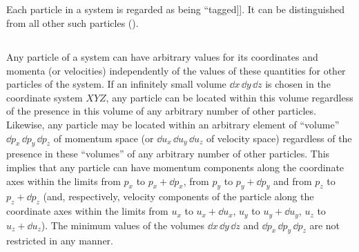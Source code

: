 \subsection{}\label{10.1.4} Each particle in a system is regarded as being ``tagged]]. It can be distinguished from all other such particles (). 

\subsection{}\label{10.1.5} Any particle of a system can have arbitrary values for its coordinates and momenta (or velocities) independently of the values of these quantities for other particles of the system. If an infinitely small volume $\dd x \,\dd y \, \dd z$ is chosen in the coor­dinate system $XYZ$, any particle can be located within this volume regardless of the presence in this volume of any arbi­trary number of other particles. Likewise, any particle may be located within an arbitrary element of ``volume'' $\dd p_{x}\, \dd p_{y}\, \dd p_{z}$ of momentum space (or $\dd u_{x}\, \dd u_{y}\, \dd u_{z}$ of velocity space) regardless of the presence in these ``volumes'' of any arbitrary number of other particles. This implies that any particle can have momen­tum components along the coordinate axes within the limits from $p_{x}$ to $p_{x} + \dd p_{x}$, from $p_{y}$ to $p_{y} + \dd p_{y}$ and from $p_{z}$ to $p_{z} + \dd p_{z}$ (and, respectively, velocity components of the par­ticle along the coordinate axes within the limits from $u_{x}$ to $u_{x} + \dd u_{x}$, $u_{y}$ to $u_{y} + \dd u_{y}$, $u_{z}$ to $u_{z} + \dd u_{z}$). The minimum values of the volumes $\dd x \,\dd y \, \dd z$ and $\dd p_{x}\, \dd p_{y}\, \dd p_{z}$ are not restricted in any manner.

